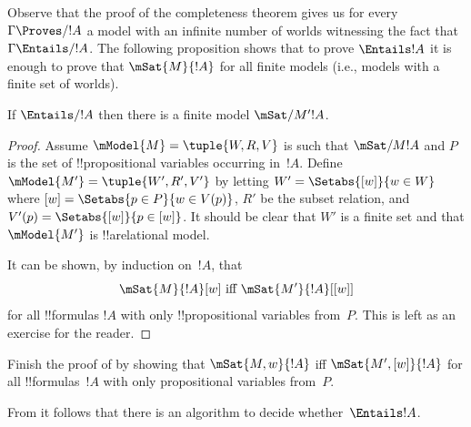 \documentclass[../../../include/open-logic-section]{subfiles}
\begin{document}

Observe that the proof of the completeness theorem gives us for every
$\Gamma \Proves/ !A$ a model with an infinite number of worlds
witnessing the fact that $\Gamma \Entails/ !A$. The following
proposition shows that to prove $\Entails !A$ it is enough to prove
that $\mSat{M}{!A}$ for all finite models (i.e., models with a finite
set of worlds).

\begin{thm}
  If $\Entails/ !A$ then there is a finite model $\mSat/{M'}{!A}$.
\end{thm}

\begin{proof}
  Assume $\mModel{M}=\tuple{W, R, V}$ is such that $\mSat/{M}{!A}$ and $P$ 
  is the set of !!{propositional variable}s occurring in~$!A$. Define
  $\mModel{M'}=\tuple{W', R', V'}$ by letting $W' = \Setabs{[w]}{w \in W}$ 
  where $[w] = \Setabs{p \in P}{w \in V(p)}$, $R'$ be the subset relation, 
  and $V'(p)=\Setabs{[w]}{p \in [w]}$. It should be clear that $W'$ is a 
  finite set and that $\mModel{M'}$ is !!a{relational model}.

  It can be shown, by induction on~$!A$, that 
  \[
    \mSat{M}{!A}[w] \text{ iff } \mSat{M'}{!A}[{[w]}]
  \]
  for all !!{formula}s $!A$ with only !!{propositional variable}s
  from~$P$. This is left as an exercise for the reader.
\end{proof}

\begin{prob}
Finish the proof of  by showing
that $\mSat{M,w}{!A}$ iff $\mSat{M',[w]}{!A}$ for all !!{formula}s~$!A$
with only propositional variables from~$P$. 
\end{prob}

From  it follows that there is an algorithm to
decide whether~$\Entails !A$.
\end{document}
